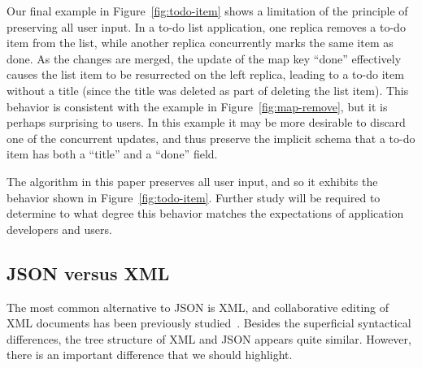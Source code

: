 \documentclass[10pt,journal,compsoc]{IEEEtran}
\begin{document}
\begin{figure*}
\centering
{}
\caption{One replica removes a list element, while another concurrently updates its contents.}\label{fig:todo-item}
\end{figure*}

Our final example in Figure~\ref{fig:todo-item} shows a limitation of the principle of preserving all user input. In a to-do list application, one replica removes a to-do item from the list, while another replica concurrently marks the same item as done. As the changes are merged, the update of the map key ``done'' effectively causes the list item to be resurrected on the left replica, leading to a to-do item without a title (since the title was deleted as part of deleting the list item). This behavior is consistent with the example in Figure~\ref{fig:map-remove}, but it is perhaps surprising to users. In this example it may be more desirable to discard one of the concurrent updates, and thus preserve the implicit schema that a to-do item has both a ``title'' and a ``done'' field.

The algorithm in this paper preserves all user input, and so it exhibits the behavior shown in Figure~\ref{fig:todo-item}. Further study will be required to determine to what degree this behavior matches the expectations of application developers and users.

\subsection{JSON versus XML}\label{sec:json-xml}

The most common alternative to JSON is XML, and collaborative editing of XML documents has been previously studied~\cite{Davis:2002iv,Ignat:2003jy,Wang:2015vo}. Besides the superficial syntactical differences, the tree structure of XML and JSON appears quite similar. However, there is an important difference that we should highlight.
\end{document}

